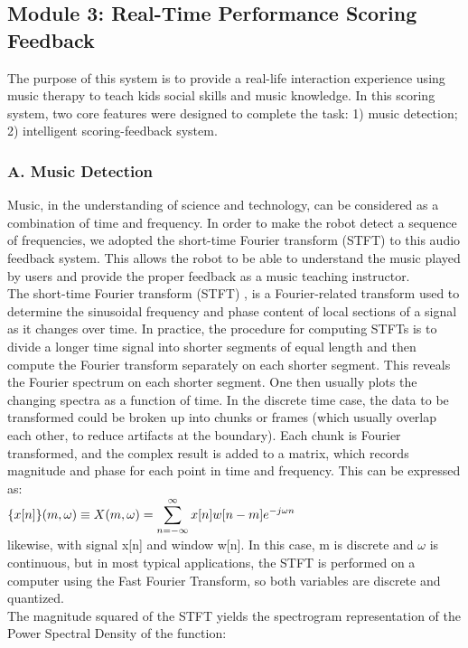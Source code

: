\documentclass[conference]{IEEEtran}
\begin{document}
\subsection{Module 3: Real-Time Performance Scoring Feedback}
The purpose of this system is to provide a real-life interaction experience using 
music therapy to teach kids social skills and music knowledge.  In this scoring 
system, two core features were designed to complete the task: 1) music detection;
2) intelligent scoring-feedback system.\\


\subsubsection{A. Music Detection}
Music, in the understanding of science and technology, can be considered as a combination 
of time and frequency. In order to make the robot detect a sequence of frequencies, we adopted the 
short-time Fourier transform (STFT) to this audio feedback system. This allows the robot to 
be able to understand the music played by users and provide the proper feedback as
a music teaching instructor.\\

The short-time Fourier transform (STFT) , is a Fourier-related transform used to 
determine the sinusoidal frequency and phase content of local sections of a signal 
as it changes over time. In practice, the procedure for computing STFTs is to divide 
a longer time signal into shorter segments of equal length and then compute the 
Fourier transform separately on each shorter segment. This reveals the Fourier 
spectrum on each shorter segment. One then usually plots the changing spectra as 
a function of time. In the discrete time case, the data to be transformed could 
be broken up into chunks or frames (which usually overlap each other, to reduce 
artifacts at the boundary). Each chunk is Fourier transformed, and the complex 
result is added to a matrix, which records magnitude and phase for each point in 
time and frequency. This can be expressed as:
\\

${\displaystyle \mathbf\{x[n]\}(m,\omega )\equiv X(m,\omega )=\sum _{n=-\infty }^{\infty }x[n]w[n-m]e^{-j\omega n}}$
\\

likewise, with signal x[n] and window w[n]. In this case, m is discrete and $\omega$ 
is continuous, but in most typical applications, the STFT is performed on a computer 
using the Fast Fourier Transform, so both variables are discrete and quantized.\\
The magnitude squared of the STFT yields the spectrogram representation of the Power 
Spectral Density of the function:
\\
\end{document}
